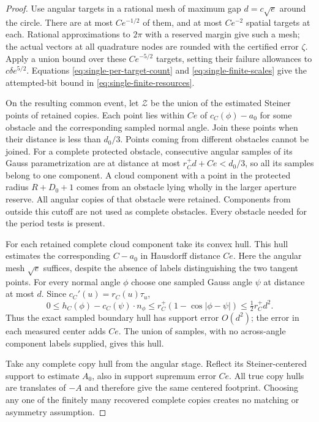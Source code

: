 \begin{proof}
Use angular targets in a rational mesh of maximum gap
$d=c\sqrt e$ around the circle.  There are at most $Ce^{-1/2}$ of
them, and at most $Ce^{-2}$ spatial targets at each.  Rational
approximations to $2\pi$ with a reserved margin give such a mesh;
the actual vectors at all quadrature nodes are rounded with the
certified error $\zeta$.  Apply a union bound over these $Ce^{-5/2}$
targets, setting their failure allowances to
$c\delta e^{5/2}$.  Equations \eqref{eq:single-per-target-count}
and \eqref{eq:single-finite-scales} give the attempted-bit bound in
\eqref{eq:single-finite-resources}.

On the resulting common event, let $\mathcal Z$ be the union of the
estimated Steiner points of retained copies.  Each point lies within
$Ce$ of $c_C(\phi)-a_0$ for some obstacle and the corresponding
sampled normal angle.  Join these points when their distance is less
than $d_0/3$.  Points coming from different obstacles cannot be
joined.  For a complete protected obstacle, consecutive angular
samples of its Gauss parametrization are at distance at most
$r_C^+d+Ce<d_0/3$, so all its samples belong to one component.
A cloud component with a point in the protected radius $R+D_0+1$
comes from an obstacle lying wholly in the larger aperture reserve.
All angular copies of that obstacle were retained.  Components from
outside this cutoff are not used as complete obstacles.  Every
obstacle needed for the period tests is present.

For each retained complete cloud component take its convex hull.
This hull estimates the corresponding $C-a_0$ in Hausdorff distance
$Ce$.  Here the angular mesh $\sqrt e$ suffices, despite the absence
of labels distinguishing the two tangent points.  For every normal
angle $\phi$ choose one sampled Gauss angle $\psi$ at distance at
most $d$.  Since $c_C'(u)=r_C(u)\tau_u$,
\begin{equation}\label{eq:single-gauss-support-deficit}
 0\le h_C(\phi)-c_C(\psi)\cdot n_\phi
    \le r_C^+(1-\cos|\phi-\psi|)
    \le\tfrac12r_C^+d^2.
\end{equation}
Thus the exact sampled boundary hull has support error $O(d^2)$;
the error in each measured center adds $Ce$.  The union of samples,
with no across-angle component labels supplied, gives this hull.

Take any complete copy hull from the angular stage.  Reflect its
Steiner-centered support to estimate $A_0$, also in support supremum
error $Ce$.  All true copy hulls are translates of $-A$ and therefore
give the same centered footprint.  Choosing any one of the finitely
many recovered complete copies creates no matching or asymmetry
assumption.


\end{proof}
